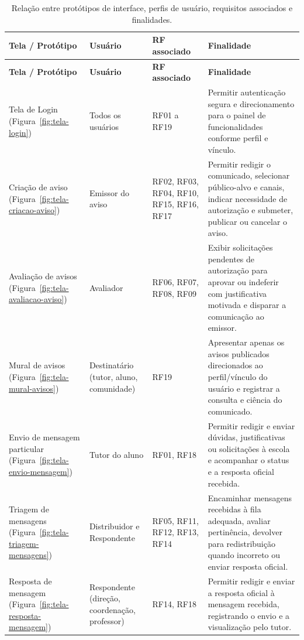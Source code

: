 \documentclass[a4paper,12pt]{report}
\begin{document}
\begin{longtable}{|p{2.9cm}|p{2.5cm}|p{2.2cm}|p{6.8cm}|}
\caption{Relação entre protótipos de interface, perfis de usuário, requisitos associados e finalidades.} \label{tab:prototipos-interface} \\
\hline
\textbf{Tela / Protótipo} & \textbf{Usuário} & \textbf{RF associado} & \textbf{Finalidade} \\
\hline
\endfirsthead
\hline
\textbf{Tela / Protótipo} & \textbf{Usuário} & \textbf{RF associado} & \textbf{Finalidade} \\
\hline
\endhead
Tela de Login \newline (Figura~\ref{fig:tela-login}) & Todos os usuários & RF01 a RF19 & Permitir autenticação segura e direcionamento para o painel de funcionalidades conforme perfil e vínculo. \\
\hline
Criação de aviso \newline (Figura~\ref{fig:tela-criacao-aviso}) & Emissor do aviso & RF02, RF03, RF04, RF10, RF15, RF16, RF17 & Permitir redigir o comunicado, selecionar público-alvo e canais, indicar necessidade de autorização e submeter, publicar ou cancelar o aviso. \\
\hline
Avaliação de avisos \newline (Figura~\ref{fig:tela-avaliacao-aviso}) & Avaliador & RF06, RF07, RF08, RF09 & Exibir solicitações pendentes de autorização para aprovar ou indeferir com justificativa motivada e disparar a comunicação ao emissor. \\
\hline
Mural de avisos \newline (Figura~\ref{fig:tela-mural-avisos}) & Destinatário (tutor, aluno, comunidade) & RF19 & Apresentar apenas os avisos publicados direcionados ao perfil/vínculo do usuário e registrar a consulta e ciência do comunicado. \\
\hline
Envio de mensagem particular \newline (Figura~\ref{fig:tela-envio-mensagem}) & Tutor do aluno & RF01, RF18 & Permitir redigir e enviar dúvidas, justificativas ou solicitações à escola e acompanhar o status e a resposta oficial recebida. \\
\hline
Triagem de mensagens \newline (Figura~\ref{fig:tela-triagem-mensagens}) & Distribuidor e Respondente & RF05, RF11, RF12, RF13, RF14 & Encaminhar mensagens recebidas à fila adequada, avaliar pertinência, devolver para redistribuição quando incorreto ou enviar resposta oficial. \\
\hline
Resposta de mensagem \newline (Figura~\ref{fig:tela-resposta-mensagem}) & Respondente (direção, coordenação, professor) & RF14, RF18 & Permitir redigir e enviar a resposta oficial à mensagem recebida, registrando o envio e a visualização pelo tutor. \\
\hline
\end{longtable}
\end{document}
